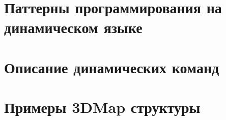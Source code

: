 \documentclass[14pt]{extbook}
\begin{document}
    
    
    

	\chapter{Паттерны программирования на динамическом языке}
    

    \appendix
    \setcounter{secnumdepth}{0}
    
    \chapter{Описание динамических команд}\label{apx:dlib_doc}
    

    \chapter{Примеры 3DMap структуры}\label{apx:3dmap}
    

    \clearpage
    \printglossaries 
\end{document}
